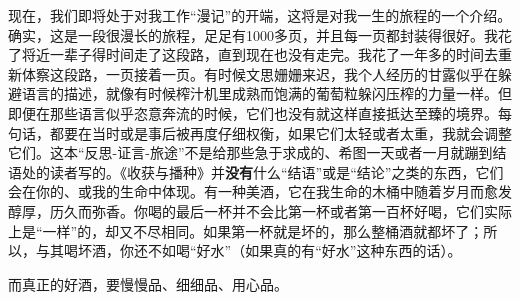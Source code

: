 \documentclass[UTF8, b5paper]{book}
\begin{document}
现在，我们即将处于对我工作“漫记”的开端，这将是对我一生的旅程的一个介绍。确实，这是一段很漫长的旅程，足足有1000多页，并且每一页都封装得很好。我花了将近一辈子得时间走了这段路，直到现在也没有走完。我花了一年多的时间去重新体察这段路，一页接着一页。有时候文思姗姗来迟，我个人经历的甘露似乎在躲避语言的描述，就像有时候榨汁机里成熟而饱满的葡萄粒躲闪压榨的力量一样。但即便在那些语言似乎恣意奔流的时候，它们也没有就这样直接抵达至臻的境界。每句话，都要在当时或是事后被再度仔细权衡，如果它们太轻或者太重，我就会调整它们。这本“反思-证言-旅途”不是给那些急于求成的、希图一天或者一月就蹦到结语处的读者写的。《收获与播种》并\textbf{没有}什么“结语”或是“结论”之类的东西，它们会在你的、或我的生命中体现。有一种美酒，它在我生命的木桶中随着岁月而愈发醇厚，历久而弥香。你喝的最后一杯并不会比第一杯或者第一百杯好喝，它们实际上是“一样”的，却又不尽相同。如果第一杯就是坏的，那么整桶酒就都坏了；所以，与其喝坏酒，你还不如喝“好水”（如果真的有“好水”这种东西的话）。\par 
而真正的好酒，要慢慢品、细细品、用心品。
\end{document}
